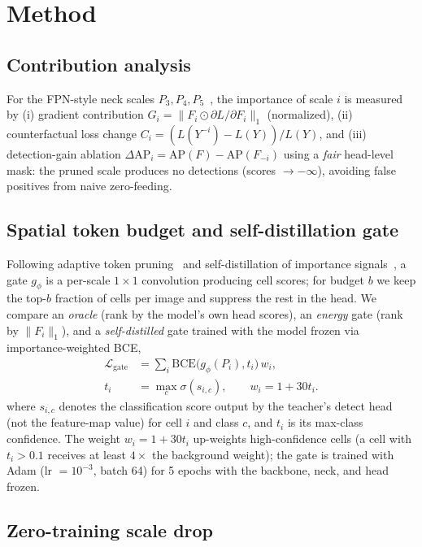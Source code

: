 \documentclass[a4paper,fleqn]{cas-dc}
\begin{document}
\section{Method}\label{sec:method}
\subsection{Contribution analysis}
For the FPN-style neck scales $P_3,P_4,P_5$~\cite{lin2017fpn}, the importance of scale $i$ is measured by (i) gradient contribution $G_i=\|F_i\odot\partial L/\partial F_i\|_1$ (normalized), (ii) counterfactual loss change $C_i=(L(Y^{-i})-L(Y))/L(Y)$, and (iii) detection-gain ablation $\Delta\text{AP}_i=\text{AP}(F)-\text{AP}(F_{-i})$ using a \emph{fair} head-level mask: the pruned scale produces no detections (scores $\to-\infty$), avoiding false positives from naive zero-feeding.

\subsection{Spatial token budget and self-distillation gate}
Following adaptive token pruning~\cite{rao2021dynamicvit,liang2022evit} and self-distillation of importance signals~\cite{xia2025tokenskip,huang2025selfcalib}, a gate $g_\phi$ is a per-scale $1\times1$ convolution producing cell scores; for budget $b$ we keep the top-$b$ fraction of cells per image and suppress the rest in the head. We compare an \emph{oracle} (rank by the model's own head scores), an \emph{energy} gate (rank by $\|F_i\|_1$), and a \emph{self-distilled} gate trained with the model frozen via importance-weighted BCE,
\begin{equation}
\begin{aligned}
\mathcal{L}_{\mathrm{gate}}&=\sum_i \mathrm{BCE}\big(g_\phi(P_i),t_i\big)\,w_i,\\
t_i&=\max_c\sigma(s_{i,c}),\qquad w_i=1+30t_i.
\end{aligned}
\end{equation}
where $s_{i,c}$ denotes the classification score output by the teacher's detect head (not the feature-map value) for cell $i$ and class $c$, and $t_i$ is its max-class confidence. The weight $w_i=1+30t_i$ up-weights high-confidence cells (a cell with $t_i>0.1$ receives at least $4\times$ the background weight); the gate is trained with Adam (lr $=10^{-3}$, batch 64) for 5 epochs with the backbone, neck, and head frozen.

\subsection{Zero-training scale drop}
\end{document}
